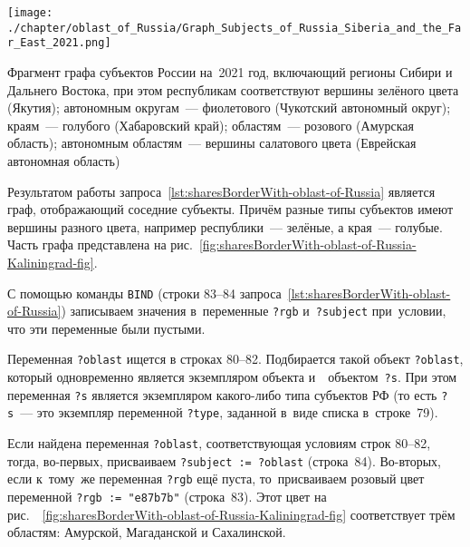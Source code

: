 \newpage
\begin{marginfigure}[0\baselineskip]
	\texttt{[image: ./chapter/oblast\_of\_Russia/Graph\_Subjects\_of\_Russia\_Siberia\_and\_the\_Far\_East\_2021.png]}
	\caption[Фрагмент графа субъектов России, 2021 год.]
    {Фрагмент графа субъектов России на~2021 год, 
    включающий регионы Сибири и Дальнего Востока, 
    при этом 
	республикам соответствуют вершины зелёного цвета (Якутия); 
	автономным округам~--- фиолетового (Чукотский автономный округ);
	краям~--- голубого (Хабаровский край);
	областям~--- розового (Амурская область);
	автономным областям~--- вершины салатового цвета (Еврейская автономная область)}%
      \label{fig:sharesBorderWith-oblast-of-Russia-Kaliningrad-fig}%
\end{marginfigure}

Результатом работы запроса~\ref{lst:sharesBorderWith-oblast-of-Russia} является граф, 
отображающий соседние субъекты. 
Причём разные типы субъектов имеют вершины разного цвета, 
например республики~--- зелёные, а края~--- голубые. 
Часть графа представлена на рис.~\ref{fig:sharesBorderWith-oblast-of-Russia-Kaliningrad-fig}.%

С помощью команды \lstinline|BIND| (строки 83--84 запроса~\ref{lst:sharesBorderWith-oblast-of-Russia}) 
записываем значения в~переменные \lstinline|?rgb| и~\mbox{\lstinline|?subject|} 
при~условии, что эти переменные были пустыми. 

Переменная \lstinline|?oblast| ищется в строках 80--82. 
Подбирается такой объект \lstinline|?oblast|, 
который одновременно является 
экземпляром объекта  
и~~объектом~\lstinline|?s|. 
При этом переменная \lstinline|?s| является экземпляром какого-либо типа субъектов РФ 
(то есть \lstinline|?s|~--- это экземпляр переменной \lstinline|?type|, 
заданной в~виде списка в~строке~79).

Если найдена переменная \lstinline|?oblast|, 
соответствующая условиям строк 80--82, 
тогда, во-первых, присваиваем \lstinline|?subject := ?oblast| (строка~84). 
Во-вторых, если к~тому~же переменная \lstinline|?rgb| ещё пуста, 
то~присваиваем розовый цвет переменной \lstinline|?rgb := "e87b7b"| (строка~83). 
Этот цвет на рис.~\protect~\ref{fig:sharesBorderWith-oblast-of-Russia-Kaliningrad-fig} 
соответствует трём областям: Амурской, Магаданской и Сахалинской. 

